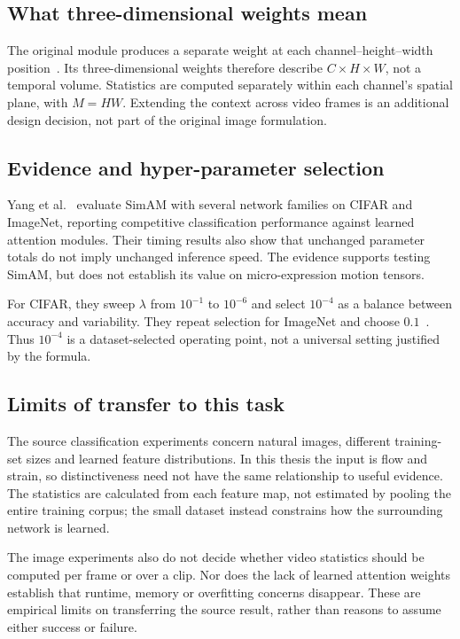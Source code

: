 \subsection{What three-dimensional weights mean}
\label{sec:simam-3d-weights}

The original module produces a separate weight at each channel--height--width position~\cite{yang2021}. Its three-dimensional weights therefore describe $C\times H\times W$, not a temporal volume. Statistics are computed separately within each channel's spatial plane, with $M=HW$. Extending the context across video frames is an additional design decision, not part of the original image formulation.

\subsection{Evidence and hyper-parameter selection}
\label{sec:simam-evidence}

Yang et al.~\cite{yang2021} evaluate SimAM with several network families on CIFAR and ImageNet, reporting competitive classification performance against learned attention modules. Their timing results also show that unchanged parameter totals do not imply unchanged inference speed. The evidence supports testing SimAM, but does not establish its value on micro-expression motion tensors.

For CIFAR, they sweep $\lambda$ from $10^{-1}$ to $10^{-6}$ and select $10^{-4}$ as a balance between accuracy and variability. They repeat selection for ImageNet and choose $0.1$~\cite{yang2021}. Thus $10^{-4}$ is a dataset-selected operating point, not a universal setting justified by the formula.

\subsection{Limits of transfer to this task}
\label{sec:simam-limitations}

The source classification experiments concern natural images, different training-set sizes and learned feature distributions. In this thesis the input is flow and strain, so distinctiveness need not have the same relationship to useful evidence. The statistics are calculated from each feature map, not estimated by pooling the entire training corpus; the small dataset instead constrains how the surrounding network is learned.

The image experiments also do not decide whether video statistics should be computed per frame or over a clip. Nor does the lack of learned attention weights establish that runtime, memory or overfitting concerns disappear. These are empirical limits on transferring the source result, rather than reasons to assume either success or failure.

